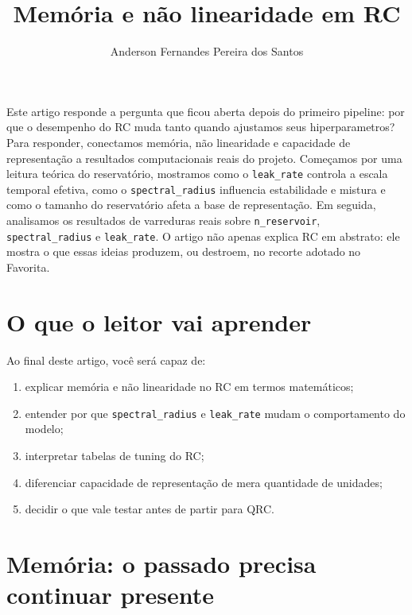 \documentclass[12pt]{article}
\title{Memória e não linearidade em RC}
\author{Anderson Fernandes Pereira dos Santos}
\providecommand{\tightlist}{%
              \setlength{\itemsep}{0pt}\setlength{\parskip}{0pt}}
\begin{document}
            \maketitle

            \begin{resumo}
            Este artigo responde a pergunta que ficou aberta depois do primeiro pipeline: por que o desempenho do RC muda tanto quando ajustamos seus hiperparametros? Para responder, conectamos memória, não linearidade e capacidade de representação a resultados computacionais reais do projeto. Começamos por uma leitura teórica do reservatório, mostramos como o \texttt{leak\_rate} controla a escala temporal efetiva, como o \texttt{spectral\_radius} influencia estabilidade e mistura e como o tamanho do reservatório afeta a base de representação. Em seguida, analisamos os resultados de varreduras reais sobre \texttt{n\_reservoir}, \texttt{spectral\_radius} e \texttt{leak\_rate}. O artigo não apenas explica RC em abstrato: ele mostra o que essas ideias produzem, ou destroem, no recorte adotado no Favorita.
            \end{resumo}

            \section{O que o leitor vai aprender}\label{1-o-que-o-leitor-vai-aprender}

Ao final deste artigo, você será capaz de:

\begin{enumerate}
\def\labelenumi{\arabic{enumi}.}
\tightlist
\item
  explicar memória e não linearidade no RC em termos matemáticos;
\item
  entender por que \texttt{spectral\_radius} e \texttt{leak\_rate} mudam o comportamento do modelo;
\item
  interpretar tabelas de tuning do RC;
\item
  diferenciar capacidade de representação de mera quantidade de unidades;
\item
  decidir o que vale testar antes de partir para QRC.
\end{enumerate}

\section{Memória: o passado precisa continuar presente}\label{2-memuxf3ria-o-passado-precisa-continuar-presente}
\end{document}
